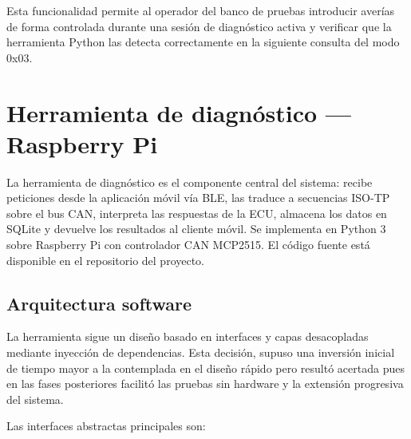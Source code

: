 Esta funcionalidad permite al operador del banco de pruebas introducir averías de forma controlada durante una sesión de diagnóstico activa y verificar que la herramienta Python las detecta correctamente en la siguiente consulta del modo 0x03.

\section{Herramienta de diagnóstico — Raspberry Pi}
\label{sec:raspberry}

La herramienta de diagnóstico es el componente central del sistema: recibe peticiones desde la aplicación móvil vía BLE, las traduce a secuencias ISO-TP sobre el bus CAN, interpreta las respuestas de la ECU, almacena los datos en SQLite y devuelve los resultados al cliente móvil. Se implementa en Python 3 sobre Raspberry Pi con controlador CAN MCP2515. El código fuente está disponible en el repositorio del proyecto.


\subsection{Arquitectura software}
\label{sec:python_arch}

La herramienta sigue un diseño basado en interfaces y capas desacopladas mediante inyección de dependencias. Esta decisión, supuso una inversión inicial de tiempo mayor a la contemplada en el diseño rápido pero resultó acertada pues en las fases posteriores facilitó las pruebas sin hardware y la extensión progresiva del sistema.

Las interfaces abstractas principales son:


